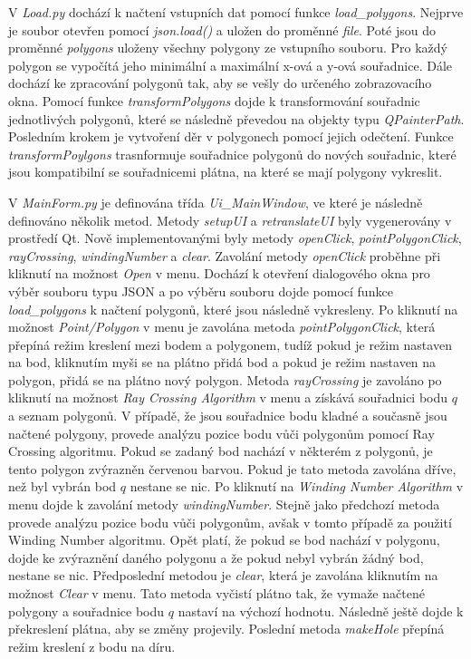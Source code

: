 \documentclass{article}
\begin{document}
\begin{spacing}{1.5}
V \textit{Load.py} dochází k načtení vstupních dat pomocí funkce \textit{load\_polygons}. Nejprve je soubor otevřen pomocí \textit{json.load()} a uložen do proměnné \textit{file}. Poté jsou do proměnné \textit{polygons} uloženy všechny polygony ze vstupního souboru. Pro každý polygon se vypočítá jeho minimální a maximální x-ová a y-ová souřadnice. Dále dochází ke zpracování polygonů tak, aby se vešly do určeného zobrazovacího okna. Pomocí funkce \textit{transformPolygons} dojde k transformování souřadnic jednotlivých polygonů, které se následně převedou na objekty typu \textit{QPainterPath}. Posledním krokem je vytvoření děr v polygonech pomocí jejich odečtení. Funkce \textit{transformPoylgons} trasnformuje souřadnice polygonů do nových souřadnic, které jsou kompatibilní se souřadnicemi plátna, na které se mají polygony vykreslit. 

V \textit{MainForm.py} je definována třída \textit{Ui\_MainWindow}, ve které je následně definováno několik metod. Metody \textit{setupUI} a \textit{retranslateUI} byly vygenerovány v prostředí Qt. Nově implementovanými byly metody \textit{openClick}, \textit{pointPolygonClick}, \textit{rayCrossing}, \textit{windingNumber} a \textit{clear}. Zavolání metody \textit{openClick} proběhne při kliknutí na možnost \textit{Open} v menu. Dochází k otevření dialogového okna pro výběr souboru typu JSON a po výběru souboru dojde pomocí funkce \textit{load\_polygons} k načtení polygonů, které jsou následně vykresleny. Po kliknutí na možnost \textit{Point/Polygon} v menu je zavolána metoda \textit{pointPolygonClick}, která přepíná režim kreslení mezi bodem a polygonem, tudíž pokud je režim nastaven na bod, kliknutím myši se na plátno přidá bod a pokud je režim nastaven na polygon, přidá se na plátno nový polygon. Metoda \textit{rayCrossing} je zavoláno po kliknutí na možnost \textit{Ray Crossing Algorithm} v menu a získává souřadnici bodu $q$ a seznam polygonů. V případě, že jsou souřadnice bodu kladné a současně jsou načtené polygony, provede analýzu pozice bodu vůči polygonům pomocí Ray Crossing algoritmu. Pokud se zadaný bod nachází v některém z polygonů, je tento polygon zvýrazněn červenou barvou. Pokud je tato metoda zavolána dříve, než byl vybrán bod $q$ nestane se nic. Po kliknutí na \textit{Winding Number Algorithm} v menu dojde k zavolání metody \textit{windingNumber}. Stejně jako předchozí metoda provede analýzu pozice bodu vůči polygonům, avšak v tomto případě za použití Winding Number algoritmu. Opět platí, že pokud se bod nachází v polygonu, dojde ke zvýraznění daného polygonu a že pokud nebyl vybrán žádný bod, nestane se nic. Předposlední metodou je \textit{clear}, která je zavolána kliknutím na možnost \textit{Clear} v menu. Tato metoda vyčistí plátno tak, že vymaže načtené polygony a souřadnice bodu $q$ nastaví na výchozí hodnotu. Následně ještě dojde k překreslení plátna, aby se změny projevily. Poslední metoda \textit{makeHole} přepíná režim kreslení z bodu na díru.


\end{spacing}
\end{document}
